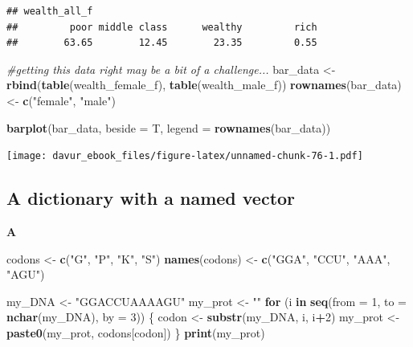 \documentclass[]{book}
\newenvironment{Shaded}{\begin{snugshade}}{\end{snugshade}}
\newcommand{\CommentTok}[1]{\textcolor[rgb]{0.56,0.35,0.01}{\textit{#1}}}
\newcommand{\ControlFlowTok}[1]{\textcolor[rgb]{0.13,0.29,0.53}{\textbf{#1}}}
\newcommand{\DataTypeTok}[1]{\textcolor[rgb]{0.13,0.29,0.53}{#1}}
\newcommand{\DecValTok}[1]{\textcolor[rgb]{0.00,0.00,0.81}{#1}}
\newcommand{\KeywordTok}[1]{\textcolor[rgb]{0.13,0.29,0.53}{\textbf{#1}}}
\newcommand{\NormalTok}[1]{#1}
\newcommand{\OperatorTok}[1]{\textcolor[rgb]{0.81,0.36,0.00}{\textbf{#1}}}
\newcommand{\StringTok}[1]{\textcolor[rgb]{0.31,0.60,0.02}{#1}}
\begin{document}
\begin{verbatim}
## wealth_all_f
##         poor middle class      wealthy         rich 
##        63.65        12.45        23.35         0.55
\end{verbatim}

\begin{Shaded}
\begin{Highlighting}[]
\CommentTok{#getting this data right may be a bit of a challenge...}
\NormalTok{bar_data <-}\StringTok{ }\KeywordTok{rbind}\NormalTok{(}\KeywordTok{table}\NormalTok{(wealth_female_f), }\KeywordTok{table}\NormalTok{(wealth_male_f))}
\KeywordTok{rownames}\NormalTok{(bar_data) <-}\StringTok{ }\KeywordTok{c}\NormalTok{(}\StringTok{"female"}\NormalTok{, }\StringTok{"male"}\NormalTok{)}

\KeywordTok{barplot}\NormalTok{(bar_data, }\DataTypeTok{beside =}\NormalTok{ T, }\DataTypeTok{legend =} \KeywordTok{rownames}\NormalTok{(bar_data))}
\end{Highlighting}
\end{Shaded}

\texttt{[image: davur\_ebook\_files/figure-latex/unnamed-chunk-76-1.pdf]}

\hypertarget{a-dictionary-with-a-named-vector-1}{%
\subsection{A dictionary with a named vector}\label{a-dictionary-with-a-named-vector-1}}

\textbf{A}

\begin{Shaded}
\begin{Highlighting}[]
\NormalTok{codons <-}\StringTok{ }\KeywordTok{c}\NormalTok{(}\StringTok{"G"}\NormalTok{, }\StringTok{"P"}\NormalTok{, }\StringTok{"K"}\NormalTok{, }\StringTok{"S"}\NormalTok{)}
\KeywordTok{names}\NormalTok{(codons) <-}\StringTok{ }\KeywordTok{c}\NormalTok{(}\StringTok{"GGA"}\NormalTok{, }\StringTok{"CCU"}\NormalTok{, }\StringTok{"AAA"}\NormalTok{, }\StringTok{"AGU"}\NormalTok{)}

\NormalTok{my_DNA <-}\StringTok{ "GGACCUAAAAGU"}
\NormalTok{my_prot <-}\StringTok{ ""}
\ControlFlowTok{for}\NormalTok{ (i }\ControlFlowTok{in} \KeywordTok{seq}\NormalTok{(}\DataTypeTok{from =} \DecValTok{1}\NormalTok{, }\DataTypeTok{to =} \KeywordTok{nchar}\NormalTok{(my_DNA), }\DataTypeTok{by =} \DecValTok{3}\NormalTok{)) \{}
\NormalTok{        codon <-}\StringTok{ }\KeywordTok{substr}\NormalTok{(my_DNA, i, i}\OperatorTok{+}\DecValTok{2}\NormalTok{)}
\NormalTok{        my_prot <-}\StringTok{ }\KeywordTok{paste0}\NormalTok{(my_prot, codons[codon])}
\NormalTok{\}}
\KeywordTok{print}\NormalTok{(my_prot)}
\end{Highlighting}
\end{Shaded}
\end{document}
